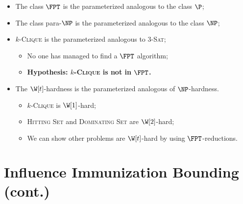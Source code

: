 \documentclass[10pt,aspectratio=169,english]{beamer}
\begin{document}
\begin{frame}
	\begin{itemize}
		\item<1-> The class $\FPT$ is the parameterized analogous to the class $\P$;
		\item<1-> The class para-$\NP$ is the parameterized analogous to the class $\NP$;
		\item<2-> $k$-\textsc{Clique} is the parameterized analogous to \textsc{3-Sat};
		\begin{itemize}
			\item<2-> No one has managed to find a $\FPT$ algorithm;
			\item<3-> \textbf{Hypothesis: $k$-\textsc{Clique} is not in $\FPT$.}
		\end{itemize}
		\item<4-> The $\W[t]$-hardness is the parameterized analogous of $\NP$-hardness.
		\begin{itemize}
			\item<4-> $k$-\textsc{Clique} is $\W[1]$-hard;
			\item<5-> \textsc{Hitting Set} and \textsc{Dominating Set} are $\W[2]$-hard;
			\item<6-> We can show other problems are $\W[t]$-hard by using $\FPT$-reductions.
		\end{itemize}
	\end{itemize}
\end{frame}

\section{Influence Immunization Bounding (cont.)}
\end{document}
